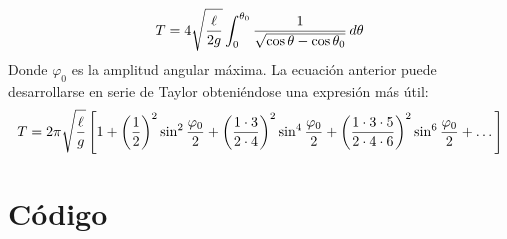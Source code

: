 \documentclass[12pt]{article}
\begin{document}
\begin{equation}
T = 4\sqrt{\ell\over 2g}\int^{\theta_0}_0 {1\over\sqrt{\cos\theta-\cos\theta_0}}\,d\theta
\end{equation}
Donde $\varphi_0$ es la amplitud angular máxima. La ecuación anterior puede desarrollarse en serie de Taylor obteniéndose una expresión más útil:
\begin{equation}
T = 2 \pi \sqrt{\ell\over g}
\left[1+ \left(\frac{1}{2}\right)^2\sin^2 \frac{\varphi_0}{2}+
\left(\frac{1\cdot 3}{2\cdot 4}\right)^2\sin^4 \frac{\varphi_0}{2}+
\left(\frac{1\cdot 3\cdot 5}{2\cdot 4\cdot 6}\right)^2\sin^6 \frac{\varphi_0}{2}+ \dots \right]
\end{equation}

\section{Código}
\end{document}
